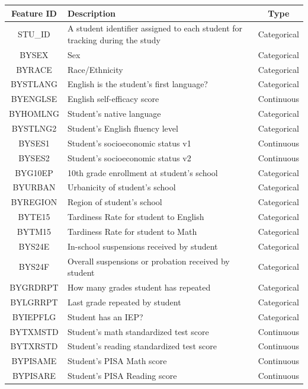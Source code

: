 \documentclass[conference]{IEEEtran}
\begin{document}
\begin{center}
\small
\begin{tabular}{| c | p{1.5in} | c |}
\hline
Feature ID & Description & Type\\
\hline
STU\_ID & A student identifier assigned to each student for tracking during the study & Categorical\\
\hline
BYSEX & Sex & Categorical\\
\hline
BYRACE & Race/Ethnicity & Categorical\\
\hline
BYSTLANG & English is the student's first language? & Categorical\\
\hline
BYENGLSE & English self-efficacy score & Continuous\\
\hline
BYHOMLNG & Student's native language & Categorical\\
\hline
BYSTLNG2 & Student's English fluency level & Categorical\\
\hline
BYSES1 & Student's socioeconomic status v1 & Continuous\\
\hline
BYSES2 & Student's socioeconomic status v2 & Continuous\\
\hline
BYG10EP & 10th grade enrollment at student's school & Categorical\\
\hline
BYURBAN & Urbanicity of student's school & Categorical\\
\hline
BYREGION & Region of student's school & Categorical\\
\hline
BYTE15 & Tardiness Rate for student to English & Categorical\\
\hline
BYTM15 & Tardiness Rate for student to Math & Categorical\\
\hline
BYS24E & In-school suspensions received by student & Categorical\\
\hline
BYS24F & Overall suspensions or probation received by student & Categorical\\
\hline
BYGRDRPT & How many grades student has repeated & Categorical\\
\hline
BYLGRRPT & Last grade repeated by student & Categorical\\
\hline
BYIEPFLG & Student has an IEP? & Categorical\\
\hline
BYTXMSTD & Student's math standardized test score & Continuous\\
\hline
BYTXRSTD & Student's reading standardized test score & Continuous\\
\hline
BYPISAME & Student's PISA Math score & Continuous\\
\hline
BYPISARE & Student's PISA Reading score & Continuous\\ 

\end{tabular}
\end{center}
\end{document}
